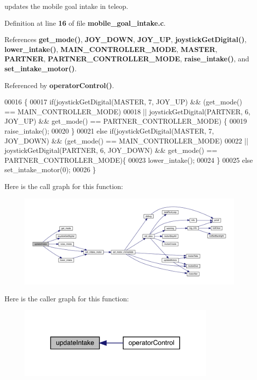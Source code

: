 updates the mobile goal intake in teleop. 



Definition at line \textbf{ 16} of file \textbf{ mobile\+\_\+goal\+\_\+intake.\+c}.



References \textbf{ get\+\_\+mode()}, \textbf{ J\+O\+Y\+\_\+\+D\+O\+WN}, \textbf{ J\+O\+Y\+\_\+\+UP}, \textbf{ joystick\+Get\+Digital()}, \textbf{ lower\+\_\+intake()}, \textbf{ M\+A\+I\+N\+\_\+\+C\+O\+N\+T\+R\+O\+L\+L\+E\+R\+\_\+\+M\+O\+DE}, \textbf{ M\+A\+S\+T\+ER}, \textbf{ P\+A\+R\+T\+N\+ER}, \textbf{ P\+A\+R\+T\+N\+E\+R\+\_\+\+C\+O\+N\+T\+R\+O\+L\+L\+E\+R\+\_\+\+M\+O\+DE}, \textbf{ raise\+\_\+intake()}, and \textbf{ set\+\_\+intake\+\_\+motor()}.



Referenced by \textbf{ operator\+Control()}.


\begin{DoxyCode}
00016                     \{
00017   \textcolor{keywordflow}{if}(joystickGetDigital(MASTER, 7, JOY_UP) && (get_mode() == 
      MAIN_CONTROLLER_MODE)
00018   || joystickGetDigital(PARTNER, 6, JOY_UP) && get_mode() == 
      PARTNER_CONTROLLER_MODE) \{
00019     raise_intake();
00020   \}
00021   \textcolor{keywordflow}{else} \textcolor{keywordflow}{if}(joystickGetDigital(MASTER, 7, JOY_DOWN) && (get_mode() == 
      MAIN_CONTROLLER_MODE)
00022   || joystickGetDigital(PARTNER, 6, JOY_DOWN) && get_mode() == 
      PARTNER_CONTROLLER_MODE)\{
00023     lower_intake();
00024   \}
00025   \textcolor{keywordflow}{else} set_intake_motor(0);
00026 \}
\end{DoxyCode}
Here is the call graph for this function\+:\nopagebreak
\begin{figure}[H]
\begin{center}
\leavevmode
\includegraphics[width=350pt]{mobile__goal__intake_8c_ad0232c21c5c1ffda603d2b7d61034118_cgraph}
\end{center}
\end{figure}
Here is the caller graph for this function\+:\nopagebreak
\begin{figure}[H]
\begin{center}
\leavevmode
\includegraphics[width=275pt]{mobile__goal__intake_8c_ad0232c21c5c1ffda603d2b7d61034118_icgraph}
\end{center}
\end{figure}
